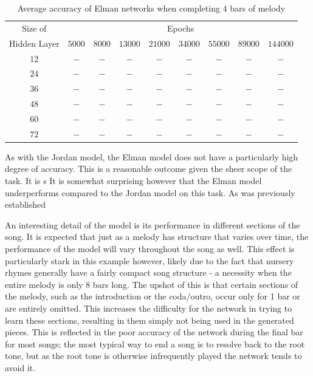 \documentclass[ author={Stephen Livermore-Tozer},
				supervisor={Dr. Peter Flach},
				degree={MEng},
				title={Algorithmic Co-composition Using Machine Learning},
				subtitle={},
				type={research},
				year={2016} ]{dissertation}
\begin{document}
	\begin{table}[htp]
		\begin{center}
			\begin{tabular}{ccccccccc}
				\toprule
				Size of& \multicolumn{8}{c}{Epochs}\\
				\cline{2-9}
				Hidden Layer& $5000$ & $8000$ & $13000$ & $21000$ & $34000$ & $55000$ & $89000$ & $144000$\\
				\hline
				$12$ & $-$ & $-$ & $-$ & $-$ & $-$ & $-$ & $-$ & $-$\\
				$24$ & $-$ & $-$ & $-$ & $-$ & $-$ & $-$ & $-$ & $-$\\
				$36$ & $-$ & $-$ & $-$ & $-$ & $-$ & $-$ & $-$ & $-$\\
				$48$ & $-$ & $-$ & $-$ & $-$ & $-$ & $-$ & $-$ & $-$\\
				$60$ & $-$ & $-$ & $-$ & $-$ & $-$ & $-$ & $-$ & $-$\\
				$72$ & $-$ & $-$ & $-$ & $-$ & $-$ & $-$ & $-$ & $-$\\
				\bottomrule
			\end{tabular}
		\end{center}
		\caption{Average accuracy of Elman networks when completing 4 bars of melody}
		\label{tab:elman-4-bar-results}
	\end{table}
	
	As with the Jordan model, the Elman model does not have a particularly high degree of accuracy. This is a reasonable outcome given the sheer scope of the task.
	It is s
	It is somewhat surprising however that the Elman model underperforms compared to the Jordan model on this task. As was previously established 
	
	An interesting detail of the model is its performance in different sections of the song. It is expected that just as a melody has structure that varies over time, the performance of the model will vary throughout the song as well. This effect is particularly stark in this example however, likely due to the fact that nursery rhymes generally have a fairly compact song structure - a necessity when the entire melody is only 8 bars long. The upshot of this is that certain sections of the melody, such as the introduction or the coda/outro, occur only for 1 bar or are entirely omitted. This increases the difficulty for the network in trying to learn these sections, resulting in them simply not being used in the generated pieces. This is reflected in the poor accuracy of the network during the final bar for most songs; the most typical way to end a song is to resolve back to the root tone, but as the root tone is otherwise infrequently played the network tends to avoid it. 
	
\end{document}
